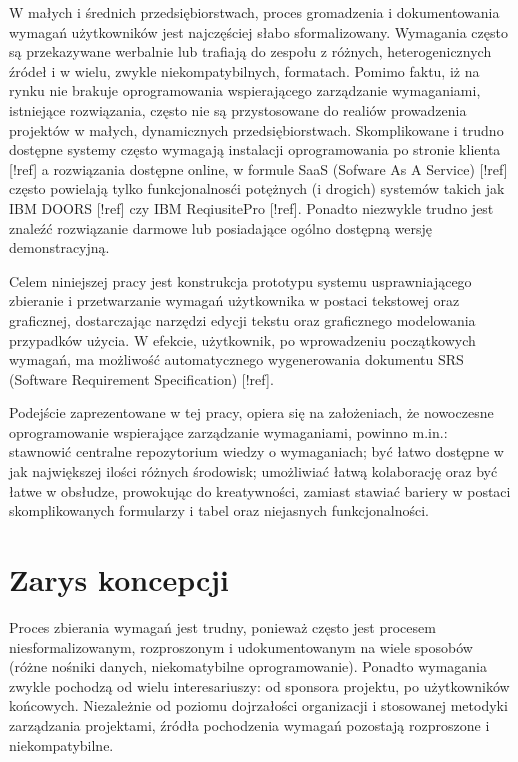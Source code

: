       W małych i średnich przedsiębiorstwach, proces gromadzenia i dokumentowania wymagań użytkowników jest najczęściej słabo sformalizowany. Wymagania często są przekazywane werbalnie lub trafiają do zespołu z różnych, heterogenicznych źródeł i w wielu, zwykle niekompatybilnych, formatach. Pomimo faktu, iż na rynku nie brakuje oprogramowania wspierającego zarządzanie wymaganiami, istniejące rozwiązania, często nie są przystosowane do realiów prowadzenia projektów w małych, dynamicznych przedsiębiorstwach. Skomplikowane i trudno dostępne systemy często wymagają instalacji oprogramowania po stronie klienta [!ref] a rozwiązania dostępne online, w formule SaaS (Sofware As A Service) [!ref] często powielają tylko funkcjonalnosći potężnych (i drogich) systemów takich jak IBM DOORS [!ref] czy IBM ReqiusitePro [!ref]. Ponadto niezwykle trudno jest znaleźć rozwiązanie darmowe lub posiadające ogólno dostępną wersję demonstracyjną. 

      Celem niniejszej pracy jest konstrukcja prototypu systemu usprawniającego zbieranie i przetwarzanie wymagań użytkownika w postaci tekstowej oraz graficznej, dostarczając narzędzi edycji tekstu oraz graficznego modelowania przypadków użycia. W efekcie, użytkownik, po wprowadzeniu początkowych wymagań, ma możliwość automatycznego wygenerowania dokumentu SRS (Software Requirement Specification) [!ref]. 
      
      Podejście zaprezentowane w tej pracy, opiera się na założeniach, że nowoczesne oprogramowanie wspierające zarządzanie wymaganiami, powinno m.in.: stawnowić centralne repozytorium wiedzy o wymaganiach; być łatwo dostępne w jak największej ilości różnych środowisk; umożliwiać łatwą kolaborację oraz być łatwe w obsłudze, prowokując do kreatywności, zamiast stawiać bariery w postaci skomplikowanych formularzy i tabel oraz niejasnych funkcjonalności. 


    \section{Zarys koncepcji}

      Proces zbierania wymagań jest trudny, ponieważ często jest procesem niesformalizowanym, rozproszonym i udokumentowanym na wiele sposobów (różne nośniki danych, niekomatybilne oprogramowanie). Ponadto wymagania zwykle pochodzą od wielu interesariuszy: od sponsora projektu, po użytkowników końcowych. Niezależnie od poziomu dojrzałości organizacji i stosowanej metodyki zarządzania projektami, źródła pochodzenia wymagań pozostają rozproszone i niekompatybilne. 

